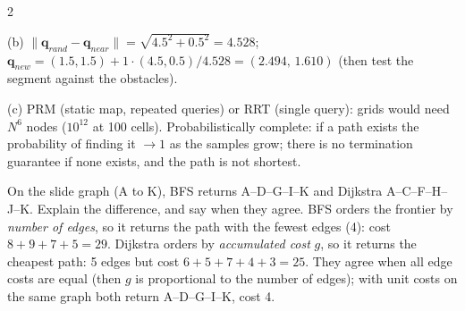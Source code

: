 \begin{multicols}{2}
\begin{examq}
(b) $\lVert\mathbf q_{rand}-\mathbf q_{near}\rVert=\sqrt{4.5^2+0.5^2}=4.528$; $\mathbf q_{new}=(1.5,1.5)+1\cdot(4.5,0.5)/4.528=\boxed{(2.494,\,1.610)}$ (then test the segment against the obstacles). \par
(c) PRM (static map, repeated queries) or RRT (single query): grids would need $N^6$ nodes ($10^{12}$ at 100 cells). Probabilistically complete: if a path exists the probability of finding it $\to1$ as the samples grow; there is no termination guarantee if none exists, and the path is not shortest. \ \chk
\end{examq}
\begin{examq}
On the slide graph (A to K), BFS returns A--D--G--I--K and Dijkstra A--C--F--H--J--K. Explain the difference, and say when they agree.
\solution
BFS orders the frontier by \emph{number of edges}, so it returns the path with the fewest edges (4): cost $8+9+7+5=29$. Dijkstra orders by \emph{accumulated cost} $g$, so it returns the cheapest path: 5 edges but cost $6+5+7+4+3=25$. They agree when all edge costs are equal (then $g$ is proportional to the number of edges); with unit costs on the same graph both return A--D--G--I--K, cost 4. \ \chk
\end{examq}
\end{multicols}
